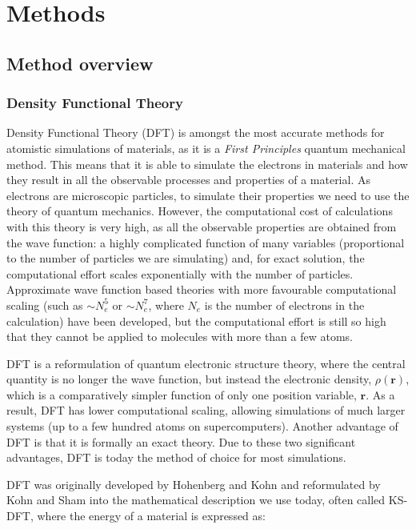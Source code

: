 \documentclass[../main.tex]{subfiles}
\begin{document}
\section{Methods}
\subsection{Method overview}
\label{sec:methods}

\subsubsection{Density Functional Theory}
\label{sec:dft}
Density Functional Theory (DFT) is amongst the most accurate methods for atomistic simulations of materials, as it is a \textit{First Principles} quantum mechanical method. This means that it is able to simulate the electrons in materials and how they result in all the observable processes and properties of a  material. As electrons are microscopic particles, to simulate their properties we need to use the theory of quantum mechanics. However, the computational cost of calculations with this theory is very high, as all the observable properties are obtained from the wave function: a highly complicated function of many variables (proportional to the number of particles we are simulating) and, for exact solution, the computational effort scales exponentially with the number of particles. Approximate wave function based theories with more favourable computational scaling (such as $\sim N_e^5$ or $\sim N_e^7$, where $N_e$ is the number of electrons in the calculation) have been developed, but the computational effort is still so high that they cannot be applied to molecules with more than a few atoms.

DFT is a reformulation of quantum electronic structure theory, where the central quantity is no longer the wave function, but instead the electronic density, $\rho(\mathbf{r})$, which is a comparatively simpler function of only one position variable, $\mathbf{r}$. As a result, DFT has lower computational scaling, allowing simulations of much larger systems (up to a few hundred atoms on supercomputers). Another advantage of DFT is that it is formally an exact theory. Due to these two significant advantages, DFT is today the method of choice for most simulations.

DFT was originally developed by Hohenberg and Kohn \cite{parr,ph1964B864} and reformulated by Kohn and Sham \cite{wk1965A1133} into the mathematical description we use today, often called KS-DFT, where the energy of a material is expressed as:
\end{document}
